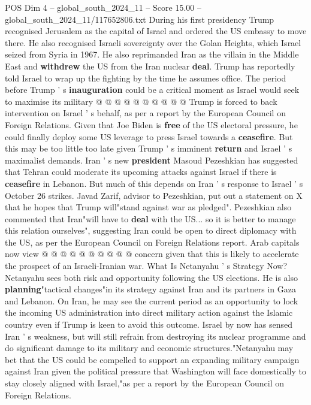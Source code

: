 \begin{textsample}{POS Dim 4 – global\_south\_2024\_11 – Score 15.00 – global\_south\_2024\_11/117652806.txt}
During his first presidency Trump recognised Jerusalem as the capital of Israel and ordered the US embassy to move there.
He also recognised Israeli sovereignty over the Golan Heights, which Israel seized from Syria in 1967.
He also reprimanded Iran as the villain in the Middle East and \textbf{withdrew} the US from the Iran nuclear \textbf{deal}.
Trump has reportedly told Israel to wrap up the fighting by the time he assumes office.
The period before Trump ' s \textbf{inauguration} could be a critical moment as Israel would seek to maximise its military @ @ @ @ @ @ @ @ @ @ Trump is forced to back intervention on Israel ' s behalf, as per a report by the European Council on Foreign Relations.
Given that Joe Biden is \textbf{free} of the US electoral pressure, he could finally deploy some US leverage to press Israel towards a \textbf{ceasefire}.
But this may be too little too late given Trump ' s imminent \textbf{return} and Israel ' s maximalist demands.
Iran ' s new \textbf{president} Masoud Pezeshkian has suggested that Tehran could moderate its upcoming attacks against Israel if there is \textbf{ceasefire} in Lebanon.
But much of this depends on Iran ' s response to Israel ' s October 26 strikes.
Javad Zarif, advisor to Pezeshkian, put out a statement on X that he hopes that Trump will"stand against war as pledged".
Pezeshkian also commented that Iran"will have to \textbf{deal} with the US... so it is better to manage this relation ourselves", suggesting Iran could be open to direct diplomacy with the US, as per the European Council on Foreign Relations report.
Arab capitals now view @ @ @ @ @ @ @ @ @ @ concern given that this is likely to accelerate the prospect of an Israeli-Iranian war.
What Is Netanyahu ' s Strategy Now?
Netanyahu sees both risk and opportunity following the US elections.
He is also \textbf{planning}"tactical changes"in its strategy against Iran and its partners in Gaza and Lebanon.
On Iran, he may see the current period as an opportunity to lock the incoming US administration into direct military action against the Islamic country even if Trump is keen to avoid this outcome.
Israel by now has sensed Iran ' s weakness, but will still refrain from destroying its nuclear programme and do significant damage to its military and economic structures."Netanyahu may bet that the US could be compelled to support an expanding military campaign against Iran given the political pressure that Washington will face domestically to stay closely aligned with Israel,"as per a report by the European Council on Foreign Relations.

\end{textsample}
